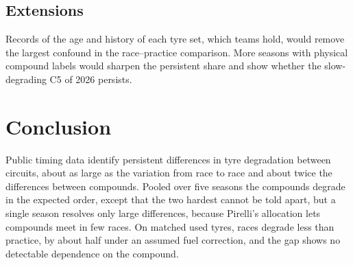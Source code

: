 \subsection{Extensions}

Records of the age and history of each tyre set, which teams hold, would remove the largest confound in the race--practice comparison.
More seasons with physical compound labels would sharpen the persistent share and show whether the slow-degrading C5 of 2026 persists.

\section{Conclusion}\label{sec:conclusion}

Public timing data identify persistent differences in tyre degradation between circuits, about as large as the variation from race to race and about twice the differences between compounds.
Pooled over five seasons the compounds degrade in the expected order, except that the two hardest cannot be told apart, but a single season resolves only large differences, because Pirelli's allocation lets compounds meet in few races.
On matched used tyres, races degrade less than practice, by about half under an assumed fuel correction, and the gap shows no detectable dependence on the compound.

